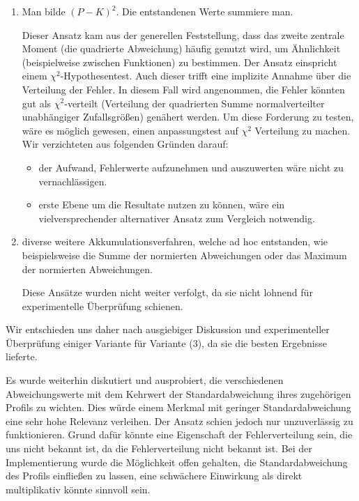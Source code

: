 \begin{enumerate}
\item Man bilde $(P-K)^2$. Die entstandenen Werte summiere man.
\par
Dieser Ansatz kam aus der generellen Feststellung, dass das zweite zentrale Moment (die quadrierte Abweichung) häufig genutzt wird, 
um Ähnlichkeit (beispielweise zwischen Funktionen) zu bestimmen.
Der Ansatz einspricht einem $\chi^2$-Hypothesentest. Auch dieser trifft eine implizite Annahme über die Verteilung der Fehler.
In diesem Fall wird angenommen, die Fehler könnten gut als $\chi^2$-verteilt (Verteilung der quadrierten Summe normalverteilter unabhängiger Zufallsgrößen) genähert werden.
Um diese Forderung zu testen, wäre es möglich gewesen, einen anpassungstest auf $\chi^2$ Verteilung zu machen.
Wir verzichteten aus folgenden Gründen darauf:
\begin{itemize}
\item
der Aufwand, Fehlerwerte aufzunehmen und auszuwerten wäre nicht zu vernachlässigen.
\item erste Ebene
um die Resultate nutzen zu können, wäre ein vielversprechender alternativer Ansatz zum Vergleich notwendig.
\end{itemize}

\item diverse weitere Akkumulationsverfahren, welche ad hoc entstanden, wie beispielsweise die Summe der normierten Abweichungen 
oder das Maximum der normierten Abweichungen.
\par
Diese Ansätze wurden nicht weiter verfolgt, da sie nicht lohnend für experimentelle Überprüfung schienen.
\end{enumerate}

Wir entschieden uns daher nach ausgiebiger Diskussion und experimenteller Überprüfung einiger Variante für Variante (3), da sie die besten Ergebnisse lieferte.
\par

Es wurde weiterhin diskutiert und ausprobiert, die verschiedenen Abweichungswerte mit dem Kehrwert der Standardabweichung ihres zugehörigen Profils zu wichten.
Dies würde einem Merkmal mit geringer Standardabweichung eine sehr hohe Relevanz verleihen.
Der Ansatz schien jedoch nur unzuverlässig zu funktionieren.
Grund dafür könnte eine Eigenschaft der Fehlerverteilung sein, die uns nicht bekannt ist, da die Fehlerverteilung nicht bekannt ist.
Bei der Implementierung wurde die Möglichkeit offen gehalten, die Standardabweichung des Profils einfließen zu lassen, 
eine schwächere Einwirkung als direkt multiplikativ könnte sinnvoll sein.

